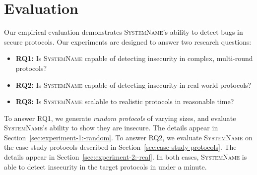\documentclass[conference]{IEEEtran}
\renewcommand{\paragraph}[1]{\vspace*{2pt}\noindent\textbf{#1}}
\newcommand{\system}{\textsc{SystemName}\xspace}
\begin{document}


\section{Evaluation}

Our empirical evaluation demonstrates \system's ability to detect bugs in secure protocols. Our experiments are designed to answer two research questions:
%
\begin{itemize}
\item \textbf{RQ1:} Is \system capable of detecting insecurity in complex, multi-round protocols?
\item \textbf{RQ2:} Is \system capable of detecting insecurity in real-world protocols?
\item \textbf{RQ3:} Is \system scalable to realistic protocols in reasonable time?
\end{itemize}
%
To answer RQ1, we generate \emph{random protocols} of varying sizes, and evaluate \system's ability to show they are insecure. The details appear in Section~\ref{sec:experiment-1:-random}. To answer RQ2, we evaluate \system on the case study protocols described in Section~\ref{sec:case-study-protocols}. The details appear in Section~\ref{sec:experiment-2:-real}. In both cases, \system is able to detect insecurity in the target protocols in under a minute.
\end{document}
